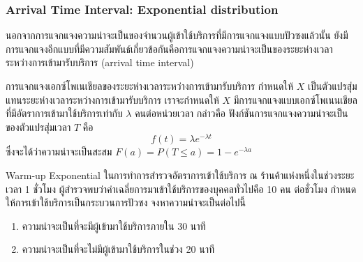 \subsubsection*{Arrival Time Interval: Exponential distribution}
นอกจากการแจกแจงความน่าจะเป็นของจำนวนผู้เข้าใช้บริการที่มีการแจกแจงแบบปัวซงแล้วนั้น ยังมีการแจกแจงอีกแบบที่มีความสัมพันธ์เกี่ยวข้อกันคือการแจกแจงความน่าจะเป็นของระยะห่างเวลาระหว่างการเข้ามารับบริการ (arrival time interval)
\begin{property}
	{การแจกแจงเอกซ์โพเนเชียลของระยะห่างเวลาระหว่างการเข้ามารับบริการ}{}
	กำหนดให้ $X$ เป็นตัวแปรสุ่มแทนระยะห่างเวลาระหว่างการเข้ามารับบริการ เราจะกำหนดให้ $X$ มีการแจกแจงแบบเอกซ์โพเนนเชียลที่มีอัตราการเข้ามาใช้บริการเท่ากับ \(\lambda\) คนต่อหน่วยเวลา กล่าวคือ ฟังก์ชันการแจกแจงความน่าจะเป็นของตัวแปรสุ่มเวลา $T$ คือ
	\[
	f(t) = \lambda e^{-\lambda t}
	\]
	ซึ่งจะได้ว่าความน่าจะเป็นสะสม $F(a) = P(T\leq a) = 1 - e^{-\lambda a}$

\begin{center}
\end{center}
\end{property}
\begin{example}
	{Warm-up Exponential}{}
	ในการทำการสำรวจอัตราการเข้าใช้บริการ ณ ร้านค้าแห่งหนึ่งในช่วงระยะเวลา 1 ชั่วโมง ผู้สำรวจพบว่าค่าเฉลี่ยการมาเข้าใช้บริการของบุคคลทั่วไปคือ 10 คน ต่อชั่วโมง กำหนดให้การเข้าใช้บริการเป็นกระบวนการปัวซง จงหาความน่าจะเป็นต่อไปนี้
	\begin{enumerate}
		\item ความน่าจะเป็นที่จะมีผู้เข้ามาใช้บริการภายใน 30 นาที
		\item ความน่าจะเป็นที่จะไม่มีผู้เข้ามาใช้บริการในช่วง 20 นาที
	\end{enumerate}
\end{example}

